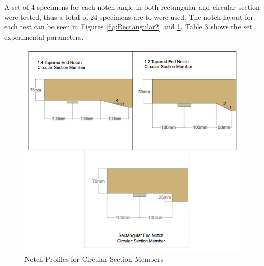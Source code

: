 \documentclass[11pt,a4paper]{article}
\numberwithin{equation}{subsection}
\begin{document}
\noindent
A set of 4 specimens for each notch angle in both rectangular and circular section were tested, thus a total of 24 specimens are to were used. The notch layout for each test can be seen in Figures \ref{fig:Rectangular2} and \ref{fig:Circular}. Table 3 shows the set experimental parameters.
\vspace*{\baselineskip}
\begin{figure}[h]
	\begin{center}
		\includegraphics[scale=0.32]{Circular_Notch_Angles}
	\end{center}
	\caption{Notch Profiles for Circular Section Members}
	\label{fig:Circular}
\end{figure}

\pagebreak
{}
\end{document}
